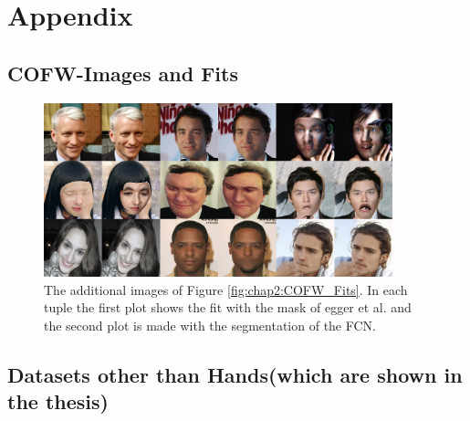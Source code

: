 \chapter{Appendix}

\section{COFW-Images and Fits}

\begin{figure}
	\centering
	\includegraphics[width=0.9\textwidth]{Figures/appendix/COFW_Fits_Appendix.png}
	\caption{The additional images of Figure \ref{fig:chap2:COFW_Fits}. In each tuple the first plot shows the fit with the mask of egger et al. and the second plot is made with the segmentation of the FCN.}
	\label{fig:chap2:COFW_Fits_Appendix}
\end{figure}

\vspace{3cm}

\section{Datasets other than Hands(which are shown in the thesis)}




